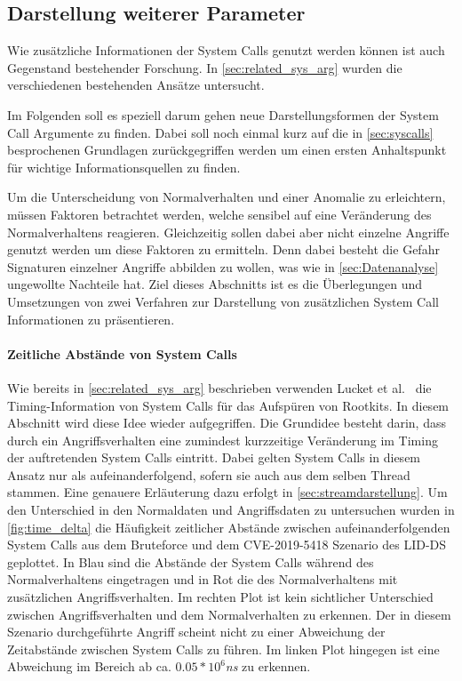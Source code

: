         \subsection{Darstellung weiterer Parameter}\label{sec:Meta}
                Wie zusätzliche Informationen der System Calls genutzt werden können ist auch Gegenstand bestehender Forschung.
                In \autoref{sec:related_sys_arg} wurden die verschiedenen bestehenden Ansätze untersucht.

                Im Folgenden soll es speziell darum gehen neue Darstellungsformen der System Call Argumente zu finden.
                Dabei soll noch einmal kurz auf die in \autoref{sec:syscalls} besprochenen Grundlagen zurückgegriffen werden um einen ersten Anhaltspunkt für wichtige Informationsquellen zu finden.

                Um die Unterscheidung von Normalverhalten und einer Anomalie zu erleichtern, müssen Faktoren betrachtet werden, welche sensibel auf eine Veränderung des Normalverhaltens reagieren.
                Gleichzeitig sollen dabei aber nicht einzelne Angriffe genutzt werden um diese Faktoren zu ermitteln.
                Denn dabei besteht die Gefahr Signaturen einzelner Angriffe abbilden zu wollen, was wie in \autoref{sec:Datenanalyse} ungewollte Nachteile hat.
                Ziel dieses Abschnitts ist es die Überlegungen und Umsetzungen von zwei Verfahren zur Darstellung von zusätzlichen System Call Informationen zu präsentieren.

                \paragraph{Zeitliche Abstände von System Calls}
                    Wie bereits in \autoref{sec:related_sys_arg} beschrieben verwenden Lucket et al.~\cite{TIMINGLUCKETT2016} die Timing-Information von System Calls für das Aufspüren von Rootkits.
                    In diesem Abschnitt wird diese Idee wieder aufgegriffen.
                    Die Grundidee besteht darin, dass durch ein Angriffsverhalten eine zumindest kurzzeitige Veränderung im Timing der auftretenden System Calls eintritt.
                    Dabei gelten System Calls in diesem Ansatz nur als aufeinanderfolgend, sofern sie auch aus dem selben Thread stammen.
                    Eine genauere Erläuterung dazu erfolgt in \autoref{sec:streamdarstellung}.
                    Um den Unterschied in den Normaldaten und Angriffsdaten zu untersuchen wurden in \autoref{fig:time_delta} die Häufigkeit zeitlicher Abstände zwischen aufeinanderfolgenden System Calls aus dem Bruteforce und dem CVE-2019-5418 Szenario des \ac{LID-DS} geplottet.
                    In Blau sind die Abstände der System Calls während des Normalverhaltens eingetragen und in Rot die des Normalverhaltens mit zusätzlichen Angriffsverhalten.
                    Im rechten Plot ist kein sichtlicher Unterschied zwischen Angriffsverhalten und dem Normalverhalten zu erkennen.
                    Der in diesem Szenario durchgeführte Angriff scheint nicht zu einer Abweichung der Zeitabstände zwischen System Calls zu führen.
                    Im linken Plot hingegen ist eine Abweichung im Bereich ab ca. $0.05*10^{6}$\textit{ns} zu erkennen.

